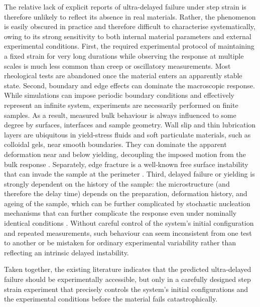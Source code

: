 The relative lack of explicit reports of ultra-delayed failure under step strain is therefore unlikely to reflect its absence in real materials. Rather, the phenomenon is easily obscured in practice and therefore difficult to characterise systematically, owing to its strong sensitivity to both internal material parameters and external experimental conditions. First, the required experimental protocol of maintaining a fixed strain for very long durations while observing the response at multiple scales is much less common than creep or oscillatory measurements. Most rheological tests are abandoned once the material enters an apparently stable state. Second, boundary and edge effects can dominate the macroscopic response. While simulations can impose periodic boundary conditions and effectively represent an infinite system, experiments are necessarily performed on finite samples. As a result, measured bulk behaviour is always influenced to some degree by surfaces, interfaces and sample geometry. Wall slip and thin lubrication layers are ubiquitous in yield-stress fluids and soft particulate materials, such as colloidal gels, near smooth boundaries. They can dominate the apparent deformation near and below yielding, decoupling the imposed motion from the bulk response \cite{Divoux2024,Walls2003,Ballesta2013,Jung2021}. Separately, edge fracture is a well-known free surface instability that can invade the sample at the perimeter \cite{ElastomersEdge2024,Hemingway2017}. Third, delayed failure or yielding is strongly dependent on the history of the sample: the microstructure (and therefore the delay time) depends on the preparation, deformation history, and ageing of the sample, which can be further complicated by stochastic nucleation mechanisms that can further complicate the response even under nominally identical conditions \cite{blindstrom_structures_2012,Divoux2024,bouzidNetworkTopologySoft2018,Cipelletti2000}. Without careful control of the system's initial configuration and repeated measurements, such behaviour can seem inconsistent from one test to another or be mistaken for ordinary experimental variability rather than reflecting an intrinsic delayed instability.

Taken together, the existing literature indicates that the predicted ultra-delayed failure should be experimentally accessible, but only in a carefully designed step strain experiment that precisely controls the system's initial configurations and the experimental conditions before the material fails catastrophically.

